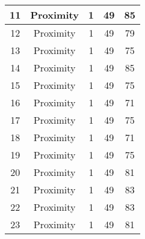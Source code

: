 \documentclass[results.tex]{subfiles}
\begin{document}
\begin{center}
\begin{tabular}{| c || c | c | c | c |}
            \hline
            11                      & Proximity                    & 1                      & 49                      & 85                   \\
            \hline
            12                      & Proximity                    & 1                      & 49                      & 79                   \\
            \hline
            13                      & Proximity                    & 1                      & 49                      & 75                   \\
            \hline
            14                      & Proximity                    & 1                      & 49                      & 85                   \\
            \hline
            15                      & Proximity                    & 1                      & 49                      & 75                   \\
            \hline
            16                      & Proximity                    & 1                      & 49                      & 71                   \\
            \hline
            17                      & Proximity                    & 1                      & 49                      & 75                   \\
            \hline
            18                      & Proximity                    & 1                      & 49                      & 71                   \\
            \hline
            19                      & Proximity                    & 1                      & 49                      & 75                   \\
            \hline
            20                      & Proximity                    & 1                      & 49                      & 81                   \\
            \hline
            21                      & Proximity                    & 1                      & 49                      & 83                   \\
            \hline
            22                      & Proximity                    & 1                      & 49                      & 83                   \\
            \hline
            23                      & Proximity                    & 1                      & 49                      & 81                   \\

\end{tabular}
\end{center}
\end{document}
